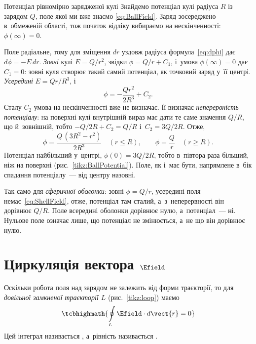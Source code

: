 \begin{Example}{Потенціал рівномірно зарядженої кулі}
	Знайдемо потенціал кулі радіуса $R$ із зарядом $Q$, поле якої ми вже знаємо
	\eqref{eq:BallField}. Заряд зосереджено в~обмеженій області, тож початок відліку
	вибираємо на нескінченності: $\phi(\infty) = 0$.

	Поле радіальне, тому для зміщення $dr$ уздовж радіуса формула~\eqref{eq:dphi} дає
	$d\phi = -E\,dr$. \emph{Зовні} кулі $E = Q/r^2$, звідки $\phi = Q/r + C_1$, і~умова
	$\phi(\infty) = 0$ дає $C_1 = 0$: зовні куля створює такий самий потенціал, як точковий
	заряд у~її центрі. \emph{Усередині} $E = Qr/R^3$, і
	\begin{equation*}
		\phi = -\frac{Qr^2}{2R^3} + C_2.
	\end{equation*}
	Сталу $C_2$ умова на нескінченності вже не визначає. Її визначає \emph{неперервність
		потенціалу}: на поверхні кулі внутрішній вираз має дати те саме значення $Q/R$, що
	й~зовнішній, тобто $-Q/2R + C_2 = Q/R$ і~$C_2 = 3Q/2R$. Отже,
	\begin{equation}\label{eq:BallPotential}
		\phi = \frac{Q\,(3R^2 - r^2)}{2R^3}\quad(r\leqslant R),\qquad
		\phi = \frac{Q}{r}\quad(r\geqslant R).
	\end{equation}
	Потенціал найбільший у~центрі, $\phi(0) = 3Q/2R$, тобто в~півтора раза більший, ніж
	на поверхні (рис.~\ref{tikz:BallPotential}). Поле, як і~має бути, напрямлене в~бік
	спадання потенціалу~--- від центру назовні.

	Так само для \emph{сферичної оболонки}: зовні $\phi = Q/r$, усередині поля
	немає~\eqref{eq:ShellField}, отже, потенціал там сталий, а~з~неперервності він дорівнює
	$Q/R$. Поле всередині оболонки дорівнює нулю, а~потенціал~--- ні. Нульове поле означає
	лише, що потенціал не змінюється, а~не що він дорівнює нулю.
\end{Example}



\section{Циркуляція вектора $\Efield$}\hypertarget{e-field-circulation}{}

Оскільки робота поля над зарядом не залежить від форми траєкторії, то для
\emph{довільної замкненої траєкторії $L$} (рис.~\ref{tikz:loop}) маємо
\begin{equation}
	\tcbhighmath{
		\oint\limits_L \Efield\cdot d\vect{r}
		= 0
	}
\end{equation}
Цей інтеграл називається , а~рівність
називається .

